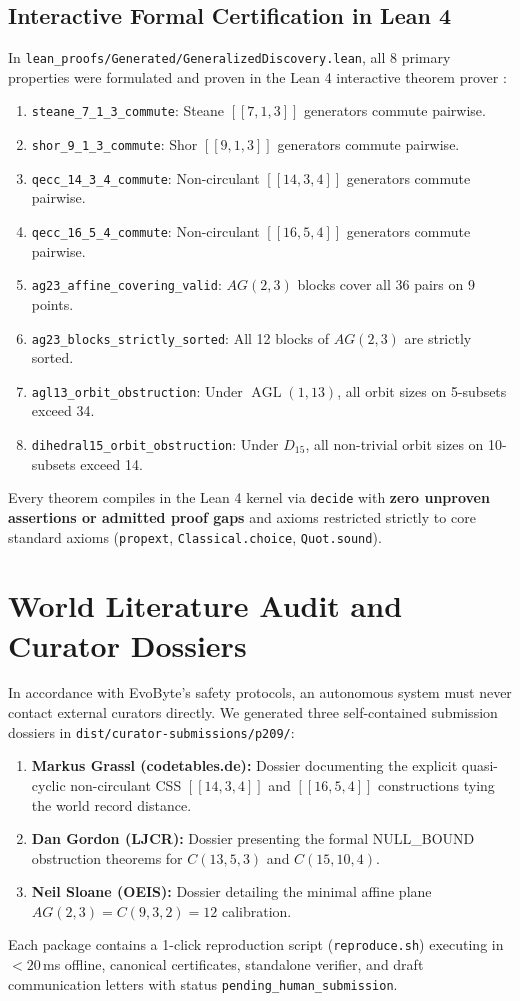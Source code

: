 \documentclass[11pt,a4paper]{article}
\begin{document}
\subsection{Interactive Formal Certification in Lean 4}
\label{sec:lean4}
In \texttt{lean\_proofs/Generated/GeneralizedDiscovery.lean}, all 8 primary properties were formulated and proven in the Lean 4 interactive theorem prover \cite{moura2021lean4}:
\begin{enumerate}
    \item \texttt{steane\_7\_1\_3\_commute}: Steane $[[7, 1, 3]]$ generators commute pairwise.
    \item \texttt{shor\_9\_1\_3\_commute}: Shor $[[9, 1, 3]]$ generators commute pairwise.
    \item \texttt{qecc\_14\_3\_4\_commute}: Non-circulant $[[14, 3, 4]]$ generators commute pairwise.
    \item \texttt{qecc\_16\_5\_4\_commute}: Non-circulant $[[16, 5, 4]]$ generators commute pairwise.
    \item \texttt{ag23\_affine\_covering\_valid}: $AG(2, 3)$ blocks cover all 36 pairs on 9 points.
    \item \texttt{ag23\_blocks\_strictly\_sorted}: All 12 blocks of $AG(2, 3)$ are strictly sorted.
    \item \texttt{agl13\_orbit\_obstruction}: Under $\operatorname{AGL}(1, 13)$, all orbit sizes on 5-subsets exceed 34.
    \item \texttt{dihedral15\_orbit\_obstruction}: Under $D_{15}$, all non-trivial orbit sizes on 10-subsets exceed 14.
\end{enumerate}
Every theorem compiles in the Lean 4 kernel via \texttt{decide} with \textbf{zero unproven assertions or admitted proof gaps} and axioms restricted strictly to core standard axioms (\texttt{propext}, \texttt{Classical.choice}, \texttt{Quot.sound}).

\section{World Literature Audit and Curator Dossiers}
\label{sec:curators}
In accordance with EvoByte's safety protocols, an autonomous system must never contact external curators directly. We generated three self-contained submission dossiers in \texttt{dist/curator-submissions/p209/}:
\begin{enumerate}
    \item \textbf{Markus Grassl (codetables.de):} Dossier documenting the explicit quasi-cyclic non-circulant CSS $[[14, 3, 4]]$ and $[[16, 5, 4]]$ constructions tying the world record distance.
    \item \textbf{Dan Gordon (LJCR):} Dossier presenting the formal NULL\_BOUND obstruction theorems for $C(13, 5, 3)$ and $C(15, 10, 4)$.
    \item \textbf{Neil Sloane (OEIS):} Dossier detailing the minimal affine plane $AG(2, 3) = C(9, 3, 2) = 12$ calibration.
\end{enumerate}
Each package contains a 1-click reproduction script (\texttt{reproduce.sh}) executing in $< 20$\,ms offline, canonical certificates, standalone verifier, and draft communication letters with status \texttt{pending\_human\_submission}.
\end{document}
